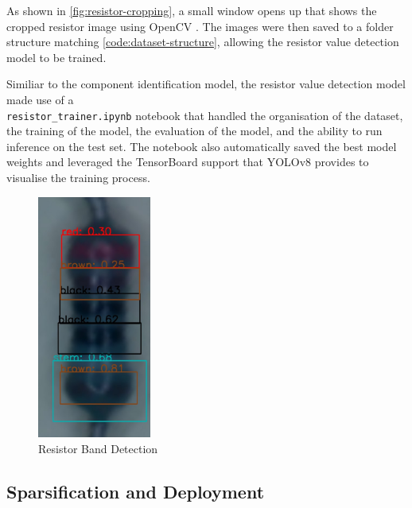As shown in \autoref{fig:resistor-cropping}, a small window opens up that shows the cropped resistor image using OpenCV \cite{home_2024}. The images were then saved to a folder structure matching \autoref{code:dataset-structure}, allowing the resistor value detection model to be trained.

Similiar to the component identification model, the resistor value detection model made use of a 
\\ \texttt{resistor\_trainer.ipynb} notebook that handled the organisation of the dataset, the training of the model, the evaluation of the model, and the ability to run inference on the test set. The notebook also automatically saved the best model weights and leveraged the TensorBoard support that YOLOv8 provides to visualise the training process.

\begin{figure}[H]
  \hfill
  \begin{minipage}[t]{\textwidth}
    \centering
    \includegraphics[height=8cm]{imgs/cv/banddetection.jpg}
    \caption{Resistor Band Detection}
    \label{fig:band-detection}
  \end{minipage}
\end{figure}

\subsection{Sparsification and Deployment}
